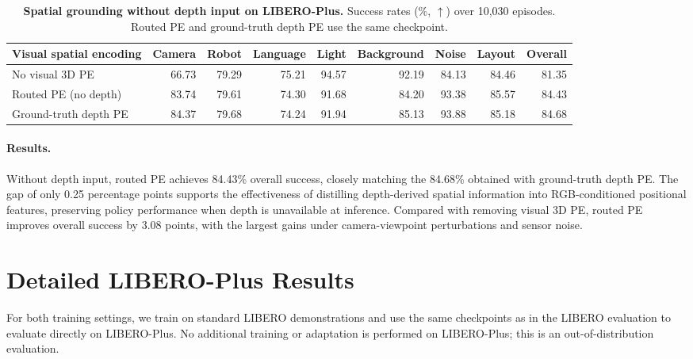 \begin{table}[!htbp]
    \centering
    \footnotesize
    \setlength{\tabcolsep}{3pt}
    \renewcommand{\arraystretch}{1.15}
    \caption{\textbf{Spatial grounding without depth input on LIBERO-Plus.}
    Success rates (\%, $\uparrow$) over 10,030 episodes. Routed PE and
    ground-truth depth PE use the same checkpoint.}
    \label{tab:app:missing_depth}
    \begin{adjustbox}{max width=\linewidth}
    \begin{tabular}{@{}lrrrrrrrr@{}}
        \toprule
        Visual spatial encoding
        & Camera & Robot & Language & Light & Background & Noise & Layout & Overall \\
        \midrule
        No visual 3D PE
        & 66.73 & 79.29 & 75.21 & 94.57 & 92.19 & 84.13 & 84.46 & 81.35 \\
        Routed PE (no depth)
        & 83.74 & 79.61 & 74.30 & 91.68 & 84.20 & 93.38 & 85.57 & 84.43 \\
        \midrule
        Ground-truth depth PE
        & 84.37 & 79.68 & 74.24 & 91.94 & 85.13 & 93.88 & 85.18 & 84.68 \\
        \bottomrule
    \end{tabular}
    \end{adjustbox}
\end{table}

\paragraph{Results.}
Without depth input, routed PE achieves 84.43\% overall success,
closely matching the 84.68\% obtained with ground-truth depth PE.
The gap of only 0.25 percentage points supports the effectiveness of
distilling depth-derived spatial information into RGB-conditioned
positional features, preserving policy performance when depth is
unavailable at inference. Compared with removing visual 3D PE, routed
PE improves overall success by 3.08 points, with the largest gains
under camera-viewpoint perturbations and sensor noise.

\section{Detailed LIBERO-Plus Results}
\label{app:libero_plus}

For both training settings, we train \method{} on standard LIBERO demonstrations
and use the same checkpoints as in the LIBERO evaluation to evaluate directly
on LIBERO-Plus. No additional training or adaptation is performed on
LIBERO-Plus; this is an out-of-distribution evaluation.

